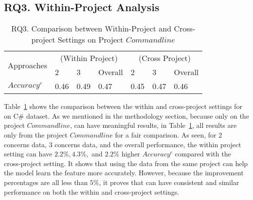 \subsection{RQ3. Within-Project Analysis}

\begin{table}[t]
	\caption{RQ3. Comparison between Within-Project and Cross-project Settings on Project $Commandline$}
	\vspace{-0.1in}
	\begin{center}
		\footnotesize
		\tabcolsep 4pt
		\renewcommand{\arraystretch}{1} \begin{tabular}{p{1.4cm}<{\centering}|p{0.8cm}<{\centering}p{0.8cm}<{\centering}p{0.8cm}<{\centering}|p{0.8cm}<{\centering}p{0.8cm}<{\centering}p{0.8cm}<{\centering}}
			
			\hline
			\multirow{2}{*}{Approaches}     & \multicolumn{3}{c|}{\tool (Within Project)} & \multicolumn{3}{c}{\tool (Cross Project)}\\
			\cline{2-7}
			                               &        2       &      3         & Overall  &      2       &        3     & Overall    \\
			
			\hline
			$Accuracy^c$   &  0.46  & 0.49  &     0.47          &	0.45   & 0.47 &	0.46	       \\

			\hline
		\end{tabular}
		\label{RQ3-result}
		
	\end{center}
\end{table}


Table~\ref{RQ3-result} shows the comparison between the within and cross-project settings for \tool on C\# dataset. As we mentioned in the methodology section, because only on the project $Commandline$, \tool can have meaningful results, in Table~\ref{RQ3-result}, all results are only from the project $Commandline$ for a fair comparison. As seen, for $2$ concerns data, $3$ concerns data, and the overall performance, the within project setting can have $2.2\%, 4.3\%,$ and $2.2\%$ higher $Accuracy^c$ compared with the cross-project setting. It shows that using the data from the same project can help the model learn the feature more accurately. However, because the improvement percentages are all less than $5\%$, it proves that \tool can have consistent and similar performance on both the within and cross-project settings.